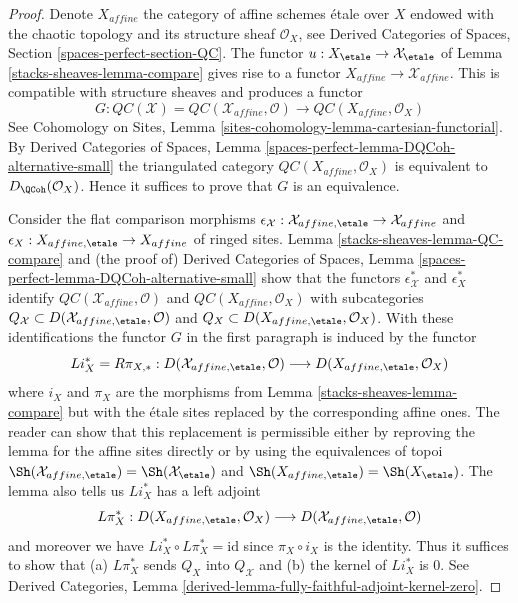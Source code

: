 \begin{proof}
Denote $X_{affine}$ the category of affine schemes \'etale over $X$
endowed with the chaotic topology and its structure sheaf $\mathcal{O}_X$, see
Derived Categories of Spaces, Section \ref{spaces-perfect-section-QC}.
The functor $u : X_\etale \to \mathcal{X}_\etale$ of Lemma \ref{stacks-sheaves-lemma-compare}
gives rise to a functor $X_{affine} \to \mathcal{X}_{affine}$.
This is compatible with structure sheaves and produces a functor
$$
G :
\mathit{QC}(\mathcal{X}) = \mathit{QC}(\mathcal{X}_{affine}, \mathcal{O})
\longrightarrow
\mathit{QC}(X_{affine}, \mathcal{O}_X)
$$
See
Cohomology on Sites, Lemma \ref{sites-cohomology-lemma-cartesian-functorial}.
By Derived Categories of Spaces, Lemma
\ref{spaces-perfect-lemma-DQCoh-alternative-small}
the triangulated category $\mathit{QC}(X_{affine}, \mathcal{O}_X)$
is equivalent to $D_\QCoh(\mathcal{O}_X)$. Hence it suffices to
prove that $G$ is an equivalence.

\medskip\noindent
Consider the flat comparison morphisms
$\epsilon_\mathcal{X} : \mathcal{X}_{affine, \etale} \to \mathcal{X}_{affine}$
and $\epsilon_X : X_{affine, \etale} \to X_{affine}$
of ringed sites. Lemma \ref{stacks-sheaves-lemma-QC-compare} and
(the proof of) Derived Categories of Spaces, Lemma
\ref{spaces-perfect-lemma-DQCoh-alternative-small}
show that the functors
$\epsilon_\mathcal{X}^*$ and $\epsilon_X^*$
identify $\mathit{QC}(\mathcal{X}_{affine}, \mathcal{O})$
and $\mathit{QC}(X_{affine}, \mathcal{O}_X)$
with subcategories
$Q_\mathcal{X} \subset D(\mathcal{X}_{affine, \etale}, \mathcal{O})$
and
$Q_X \subset D(X_{affine, \etale}, \mathcal{O}_X)$.
With these identifications
the functor $G$ in the first paragraph is induced by the functor
$$
Li_X^* = R\pi_{X, *}:
D(\mathcal{X}_{affine, \etale}, \mathcal{O})
\longrightarrow
D(X_{affine, \etale}, \mathcal{O}_X)
$$
where $i_X$ and $\pi_X$ are the morphisms from Lemma \ref{stacks-sheaves-lemma-compare}
but with the \'etale sites replaced by the corresponding affine ones.
The reader can show that this replacement is permissible either
by reproving the lemma for the affine sites directly or
by using the equivalences of topoi
$\Sh(\mathcal{X}_{affine, \etale}) = \Sh(\mathcal{X}_\etale)$ and
$\Sh(X_{affine, \etale}) = \Sh(X_\etale)$.
The lemma also tells us $Li_X^*$ has a left adjoint
$$
L\pi_X^*:
D(X_{affine, \etale}, \mathcal{O}_X)
\longrightarrow
D(\mathcal{X}_{affine, \etale}, \mathcal{O})
$$
and moreover we have $Li_X^* \circ L\pi_X^* = \text{id}$
since $\pi_X \circ i_X$ is the identity. Thus it suffices
to show that (a) $L\pi_X^*$ sends $Q_X$ into $Q_\mathcal{X}$
and (b) the kernel of $Li_X^*$ is $0$.
See Derived Categories, Lemma
\ref{derived-lemma-fully-faithful-adjoint-kernel-zero}.


\end{proof}
